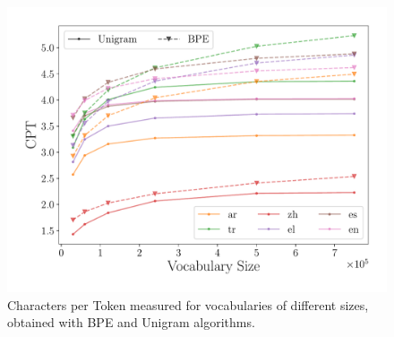 \begin{figure}[tb!]
    \centering
    \includegraphics[width=1.0\linewidth]{figures/CPT_x_vocabulary_.pdf}
    
    \caption{Characters per Token measured for vocabularies of different sizes, obtained with BPE and Unigram algorithms.}
    \label{fig:cpt_vocab}
\end{figure}